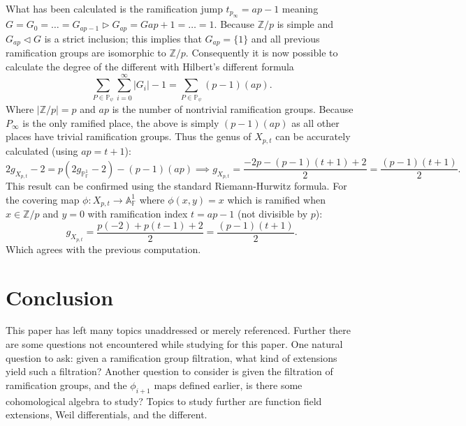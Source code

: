 \documentclass[paper=a4, fontsize=11pt]{scrartcl} %
\numberwithin{equation}{section} %
\numberwithin{figure}{section} %
\numberwithin{table}{section} %
\theoremstyle{break}
\begin{document}
What has been calculated is the ramification jump $t_{p_\infty} = ap-1$ meaning $G = G_0=\ldots =G_{ap-1} \triangleright G_{ap} = G{ap+1}=\ldots ={1}$. Because $\mathbb{Z}/p$ is simple and $G_{ap} \triangleleft G$ is a strict inclusion; this implies that $G_{ap} = \{1\}$ and all previous ramification groups are isomorphic to $\mathbb{Z}/p$. Consequently it is now possible to calculate the degree of the different with Hilbert's different formula
$$
\sum_{P\in\mathbb{P}_\psi} \sum_{i=0}^\infty |G_i| - 1 = \sum_{P\in\mathbb{P}_\psi} (p-1)(ap).
$$
Where $|\mathbb{Z}/p|=p$ and $ap$ is the number of nontrivial ramification groups. Because $P_\infty$ is the only ramified place, the above is simply $(p-1)(ap)$ as all other places have trivial ramification groups. Thus the genus of $X_{p,t}$ can be accurately calculated (using $ap=t+1$):
$$
2g_{X_{p,t}} -2= p(2g_{\mathbb{P}^1_{\mathbb{F}}} -2) - (p-1)(ap) \implies  g_{X_{p,t}} = \frac{-2p-(p-1)(t+1)+2}{2}=\frac{(p-1)(t+1)}{2}.
$$
This result can be confirmed using the standard Riemann-Hurwitz formula. For the covering map $\phi:X_{p,t} \to \mathbb{A}_\mathbb{F}^1$ where $\phi(x,y)=x$ which is ramified when $x\in \mathbb{Z}/p$ and $y=0$ with ramification index $t=ap-1$ (not divisible by $p$):
$$
g_{X_{p,t}} = \frac{p(-2) + p(t-1) +2}{2} = \frac{(p-1)(t+1)}{2}.
$$
Which agrees with the previous computation.
\section{Conclusion}
This paper has left many topics unaddressed or merely referenced. Further there are some questions not encountered while studying for this paper. One natural question to ask: given a ramification group filtration, what kind of extensions yield such a filtration? Another question to consider is given the filtration of ramification groups, and the $\phi_{i+1}$ maps defined earlier, is there some cohomological algebra to study? Topics to study further are function field extensions, Weil differentials, and the different. 

\clearpage
\printbibliography
\end{document}
